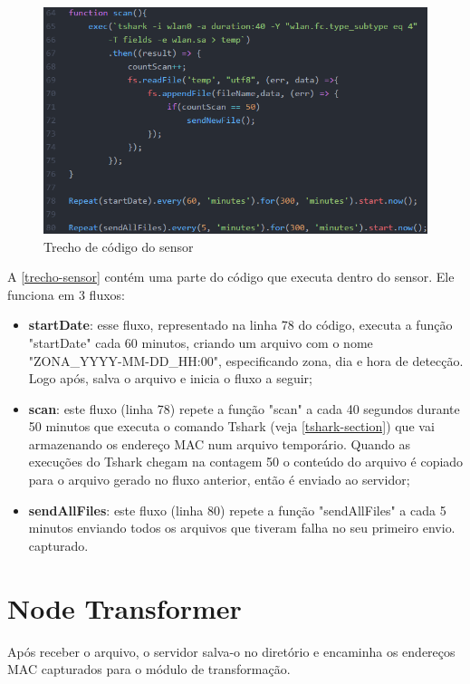 \begin{figure}[!h]
  \caption{\label{trecho-sensor}Trecho de código do sensor}
  \begin{center}
    \includegraphics[width=1.0\textwidth]{img/sensor.png}
  \end{center}
\end{figure}

A \autoref{trecho-sensor} contém uma parte do código que executa dentro do
sensor. Ele funciona em 3 fluxos:

\begin{itemize}
    \item \textbf{startDate}: esse fluxo, representado na linha 78
    do código, executa a função "startDate" cada 60 minutos, criando um arquivo com
    o nome "ZONA\_YYYY-MM-DD\_HH:00", especificando zona, dia e hora de detecção. Logo
    após, salva o arquivo e inicia o fluxo a seguir;
    \item \textbf{scan}: este fluxo (linha 78) repete a função "scan" a cada 40 segundos durante 50 minutos que executa o
    comando Tshark (veja \autoref{tshark-section}) que vai armazenando os endereço
    MAC num arquivo temporário. Quando as execuções do Tshark chegam na contagem 50
    o conteúdo do arquivo  é copiado para o arquivo gerado no fluxo anterior, então é enviado ao servidor;
    \item \textbf{sendAllFiles}: este fluxo (linha 80) repete a função "sendAllFiles" a cada 5 minutos enviando todos os arquivos que tiveram falha no seu
    primeiro envio.
    capturado.
\end{itemize}

\section{Node Transformer}
\label{node-transformer}
Após receber o arquivo, o servidor salva-o no diretório e encaminha os endereços MAC capturados para o
módulo de transformação.

